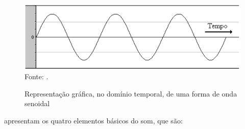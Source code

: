 \begin{figure}[!htb]
   \centering
   \caption{Representação gráfica, no domínio temporal, de uma forma de onda senoidal}\label{fig:ondaSenoidal} 
   \includegraphics[scale=0.4]{figuras/ondaSenoidal.png}
   Fonte: \cite{miletto2004}.
\end{figure}

 apresentam os quatro elementos básicos do som, que são:
